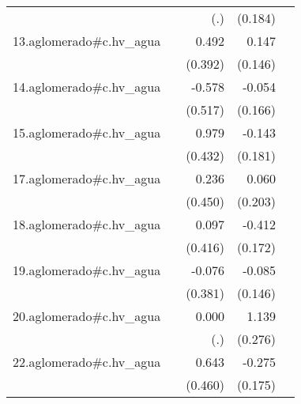 {\begin{longtable}{l*{4}{D{.}{.}{-1}}}
            &                     &         (.)         &     (0.184)         &                     \\
\addlinespace
13.aglomerado#c.hv\_agua&                     &       0.492         &       0.147         &                     \\
            &                     &     (0.392)         &     (0.146)         &                     \\
\addlinespace
14.aglomerado#c.hv\_agua&                     &      -0.578         &      -0.054         &                     \\
            &                     &     (0.517)         &     (0.166)         &                     \\
\addlinespace
15.aglomerado#c.hv\_agua&                     &       0.979\sym{*}  &      -0.143         &                     \\
            &                     &     (0.432)         &     (0.181)         &                     \\
\addlinespace
17.aglomerado#c.hv\_agua&                     &       0.236         &       0.060         &                     \\
            &                     &     (0.450)         &     (0.203)         &                     \\
\addlinespace
18.aglomerado#c.hv\_agua&                     &       0.097         &      -0.412\sym{*}  &                     \\
            &                     &     (0.416)         &     (0.172)         &                     \\
\addlinespace
19.aglomerado#c.hv\_agua&                     &      -0.076         &      -0.085         &                     \\
            &                     &     (0.381)         &     (0.146)         &                     \\
\addlinespace
20.aglomerado#c.hv\_agua&                     &       0.000         &       1.139\sym{***}&                     \\
            &                     &         (.)         &     (0.276)         &                     \\
\addlinespace
22.aglomerado#c.hv\_agua&                     &       0.643         &      -0.275         &                     \\
            &                     &     (0.460)         &     (0.175)         &                     \\

\end{longtable}}
